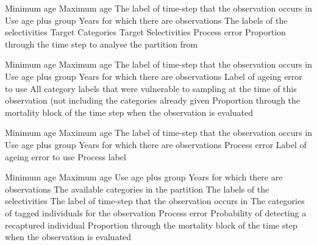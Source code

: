  {Minimum age}
 {Maximum age}
 {The label of time-step that the observation occurs in}
 {Use age plus group}
 {Years for which there are observations}
 {The labels of the selectivities}
 {Target Categories}
 {Target Selectivities}
 {Process error}
 {Proportion through the time step to analyse the partition from}
\par\textbf{}\par
{} {Minimum age}
 {Maximum age}
 {The label of time-step that the observation occurs in}
 {Use age plus group}
 {Years for which there are observations}
 {Label of ageing error to use}
 {All category labels that were vulnerable to sampling at the time of this observation (not including the categories already given}
 {Proportion through the mortality block of the time step when the observation is evaluated}
\par\textbf{}\par
{} {Minimum age}
 {Maximum age}
 {The label of time-step that the observation occurs in}
 {Use age plus group}
 {Years for which there are observations}
 {Process error}
 {Label of ageing error to use}
 {Process label}
\par\textbf{}\par
{} {Minimum age}
 {Maximum age}
 {Use age plus group}
 {Years for which there are observations}
 {The available categories in the partition}
 {The labels of the selectivities}
 {The label of time-step that the observation occurs in}
 {The categories of tagged individuals for the observation}
 {Process error}
 {Probability of detecting a recaptured individual}
 {Proportion through the mortality block of the time step when the observation is evaluated}
